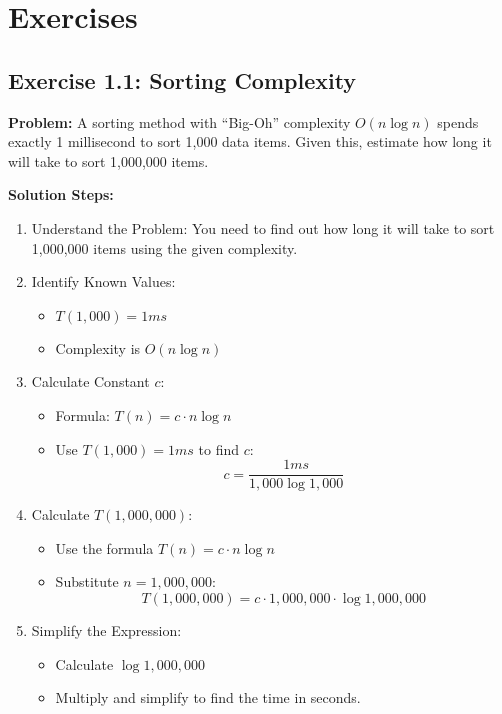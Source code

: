 \clearpage

\section{Exercises}

\subsection{Exercise 1.1: Sorting Complexity}
\textbf{Problem:} A sorting method with “Big-Oh” complexity $O(n \log n)$ spends exactly 1 millisecond to sort 1,000 data items. Given this, estimate how long it will take to sort 1,000,000 items.

\vspace{0.5em}
\textbf{Solution Steps:}
\begin{enumerate}[leftmargin=*,noitemsep]
    \item Understand the Problem: You need to find out how long it will take to sort 1,000,000 items using the given complexity.
    \item Identify Known Values:
    \begin{itemize}
        \item $T(1,000) = 1ms$
        \item Complexity is $O(n \log n)$
    \end{itemize}
    \item Calculate Constant $c$:
    \begin{itemize}
        \item Formula: $T(n) = c \cdot n \log n$
        \item Use $T(1,000) = 1ms$ to find $c$:
        \[ c = \frac{1ms}{1,000 \log 1,000} \]
    \end{itemize}
    \item Calculate $T(1,000,000)$:
    \begin{itemize}
        \item Use the formula $T(n) = c \cdot n \log n$
        \item Substitute $n = 1,000,000$:
        \[ T(1,000,000) = c \cdot 1,000,000 \cdot \log 1,000,000 \]
    \end{itemize}
    \item Simplify the Expression:
    \begin{itemize}
        \item Calculate $\log 1,000,000$
        \item Multiply and simplify to find the time in seconds.
    \end{itemize}
\end{enumerate}

